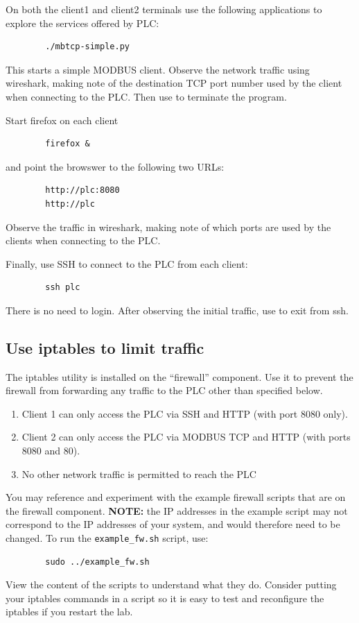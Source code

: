 On both the client1 and client2 terminals use the following applications
to explore the services offered by PLC:

\begin{verbatim}
        ./mbtcp-simple.py
\end{verbatim}
This starts a simple MODBUS client.  Observe the network traffic using
wireshark, making note of the destination TCP port number used by the client when
connecting to the PLC. Then use {\tt <ctrl C>} to terminate the program.

\noindent Start firefox on each client 
\begin{verbatim}
        firefox &
\end{verbatim}
\noindent and point the browswer to the following two URLs:
\begin{verbatim}
        http://plc:8080
        http://plc
\end{verbatim}
\noindent Observe the traffic in wireshark, making note of which ports are used by the 
clients when connecting to the PLC.

\noindent Finally, use SSH to connect to the PLC from each client:
\begin{verbatim}
        ssh plc
\end{verbatim}
\noindent There is no need to login.  After observing the initial traffic,
use {\tt <ctrl C>} to exit from ssh.

\subsection{Use iptables to limit traffic}
The iptables utility is installed on the ``firewall'' component.
Use it to prevent the firewall from forwarding any traffic
to the PLC other than specified below.

\begin{enumerate}
\item Client 1 can only access the PLC via SSH and HTTP 
(with port 8080 only).
\item Client 2 can only access the PLC via MODBUS TCP and HTTP 
(with ports 8080 and 80).
\item No other network traffic is permitted to reach the PLC
\end{enumerate}

You may reference and experiment with the example firewall scripts that
are on the firewall component.  \textbf{NOTE:} the IP addresses in the example
script may not correspond to the IP addresses of your system, and would
therefore need to be changed.  To run the {\tt example\_fw.sh} script, use:
\begin{verbatim}
        sudo ../example_fw.sh
\end{verbatim}
View the content of the scripts to understand what they do.
Consider putting your iptables commands in a script so it is easy
to test and reconfigure the iptables if you restart the lab.

